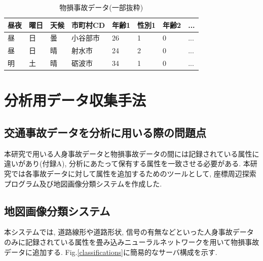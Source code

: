 \documentclass[a4j,8.5pt, twocolumn,fleqn]{jbook}
\begin{document}
\begin{table}[htb]
    \caption{物損事故データ(一部抜粋)}
    \label{物損事故データ}
    \small
    \begin{tabular}{|l|l|l|l|l|l|l|l|}
        \hline
        \textbf{昼夜} & \textbf{曜日} & \textbf{天候} & \textbf{市町村CD} & \textbf{年齢1} & \textbf{性別1} & \textbf{年齢2} & \textbf{...} \\ \hline
        昼           & 日           & 曇           & 小谷部市           & 26              & 1               & 0               & ...          \\ \hline
        昼           & 日           & 晴           & 射水市            & 24              & 2               & 0               & ...          \\ \hline
        明           & 土           & 晴           & 砺波市            & 34              & 1               & 0               & ...          \\ \hline
    \end{tabular}
\end{table}




\section{分析用データ収集手法}
\subsection{交通事故データを分析に用いる際の問題点}
本研究で用いる人身事故データと物損事故データの間には記録されている属性に違いがあり(付録A), 分析にあたって保有する属性を一致させる必要がある. 
本研究では各事故データに対して属性を追加するためのツールとして, 座標周辺探索プログラム及び地図画像分類システムを作成した. 


\subsection{地図画像分類システム}
本システムでは, 道路線形や道路形状, 信号の有無などといった人身事故データのみに記録されている属性を畳み込みニューラルネットワークを用いて物損事故データに追加する. Fig.\ref{classifications}に簡易的なサーバ構成を示す. 
\end{document}
